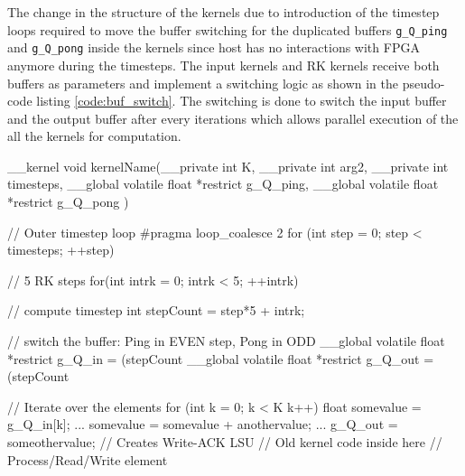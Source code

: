 The change in the structure of the kernels due to introduction of the timestep loops
required to move the buffer switching for the duplicated buffers \texttt{g\_Q\_ping} and
\texttt{g\_Q\_pong} inside the kernels since host has no interactions with FPGA anymore
during the timesteps. The input kernels and RK kernels receive both buffers as parameters
and implement a switching logic as shown in the pseudo-code listing \ref{code:buf_switch}.
The switching is done to switch the input buffer and the output buffer after every iterations
which allows parallel execution of the all the kernels for computation.
\begin{CppCode}[caption=Buffer switching for FPGA only design within the kernel, frame=tlrb, label=code:buf_switch]
__kernel void kernelName(__private int K,
                        __private int arg2,
                        __private int timesteps,
                        __global volatile float  *restrict g_Q_ping,
                        __global volatile float  *restrict g_Q_pong
                        )
{
    // Outer timestep loop
    #pragma loop_coalesce 2
    for (int step = 0; step < timesteps; ++step)
    {
        // 5 RK steps
        for(int intrk = 0; intrk < 5; ++intrk)
        {
            // compute timestep
            int stepCount = step*5 + intrk;

            // switch the buffer: Ping in EVEN step, Pong in ODD
            __global volatile float *restrict g_Q_in = (stepCount%
            __global volatile float *restrict g_Q_out = (stepCount%

            // Iterate over the elements
            for (int k = 0; k < K k++)
            {
                float somevalue = g_Q_in[k];
                ...
                somevalue = somevalue + anothervalue;
                ...
                g_Q_out = someothervalue; // Creates Write-ACK LSU
            }
            // Old kernel code inside here
            // Process/Read/Write element
        }
    }
}
\end{CppCode}

